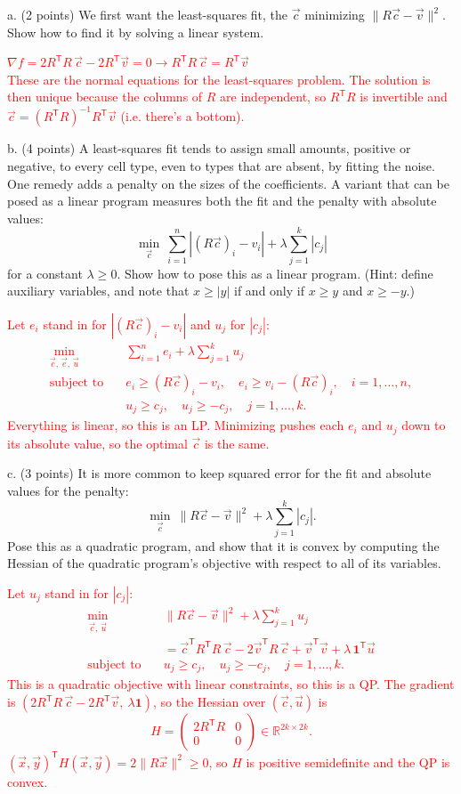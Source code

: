 \documentclass[11pt]{article}
\newcommand{\T}{\mathsf T}
\begin{document}
a. (2 points) We first want the least-squares fit, the $\vec c$ minimizing $\|R\vec c-\vec v\|^2$.
Show how to find it by solving a linear system.

\textcolor{red}{
$\nabla f = 2R^\T R\,\vec c - 2R^\T\vec v = 0 \rightarrow R^\T R\,\vec c = R^\T\vec v$\\
These are the normal equations for the least-squares problem. The solution is then unique because the columns of $R$ are independent, so $R^\T R$ is invertible and $\vec c = (R^\T R)^{-1}R^\T\vec v$ (i.e. there's a bottom).
}

b. (4 points) A least-squares fit tends to assign small amounts, positive or negative, to every
cell type, even to types that are absent, by fitting the noise. One remedy adds a penalty on the sizes of the
coefficients. A variant
that can be posed as a linear program measures both the fit and the penalty with absolute
values:
\[
\min_{\vec c}\ \sum_{i=1}^n|(R\vec c)_i-v_i|+\lambda\sum_{j=1}^k|c_j|
\]
for a constant $\lambda\ge0$. Show how to pose this as a linear program. (Hint: define auxiliary
variables, and note that $x\ge|y|$ if and only if $x\ge y$ and $x\ge-y$.)

\textcolor{red}{
Let $e_i$ stand in for $|(R\vec c)_i - v_i|$ and $u_j$ for $|c_j|$:
\begin{align*}
\min_{\vec c,\,\vec e,\,\vec u}\quad & \sum_{i=1}^n e_i + \lambda\sum_{j=1}^k u_j \\
\text{subject to}\quad & e_i \ge (R\vec c)_i - v_i, \quad e_i \ge v_i - (R\vec c)_i, \quad i = 1,\dots,n, \\
& u_j \ge c_j, \quad u_j \ge -c_j, \quad j = 1,\dots,k.
\end{align*}
Everything is linear, so this is an LP. Minimizing pushes each $e_i$ and $u_j$ down to its absolute value, so the optimal $\vec c$ is the same.
}

c. (3 points) It is more common to keep squared error for the fit and absolute values for the
penalty:
\[
\min_{\vec c}\ \|R\vec c-\vec v\|^2+\lambda\sum_{j=1}^k|c_j|.
\]
Pose this as a quadratic program, and show that it is convex by computing the Hessian of the quadratic
program's objective with respect to all of its variables.

\textcolor{red}{
Let $u_j$ stand in for $|c_j|$:
\begin{align*}
\min_{\vec c,\,\vec u}\quad & \|R\vec c - \vec v\|^2 + \lambda\sum_{j=1}^k u_j \\
& = \vec c^\T R^\T R\,\vec c - 2\vec v^\T R\,\vec c + \vec v^\T\vec v + \lambda\,\mathbf 1^\T\vec u \\
\text{subject to}\quad & u_j \ge c_j, \quad u_j \ge -c_j, \quad j = 1,\dots,k.
\end{align*}
This is a quadratic objective with linear constraints, so this is a QP. The gradient is $(2R^\T R\,\vec c - 2R^\T\vec v,\ \lambda\mathbf 1)$, so the Hessian over $(\vec c, \vec u)$ is
\[
H = \begin{pmatrix} 2R^\T R & 0 \\ 0 & 0 \end{pmatrix} \in \mathbb R^{2k\times 2k}.
\]
$(\vec x, \vec y)^\T H(\vec x, \vec y) = 2\|R\vec x\|^2 \ge 0$, so $H$ is positive semidefinite and the QP is convex.
}
\end{document}

